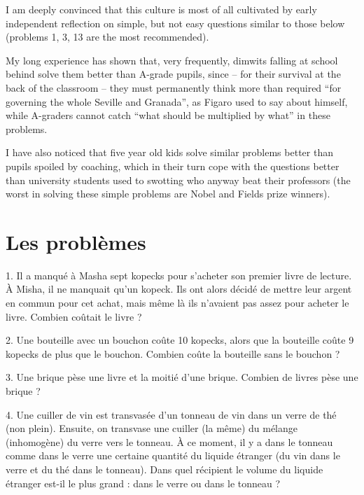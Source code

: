 I am deeply convinced that this culture is most of all cultivated by early independent reflection
on simple, but not easy questions similar to those below (problems 1, 3, 13 are the most recommended).

My long experience has shown that, very frequently, dimwits falling at school behind solve them better
than A-grade pupils, since -- for their survival at the back of the classroom -- they must permanently
think more than required \enquote{for governing the whole Seville and Granada}, as Figaro used to say about
himself, while A-graders cannot catch \enquote{what should be multiplied by what} in these problems.

I have also noticed that five year old kids solve similar problems better than pupils spoiled
by coaching, which in their turn cope with the questions better than university students used
to swotting who anyway beat their professors (the worst in solving these simple problems are
Nobel and Fields prize winners).

\clearpage
\section*{Les problèmes}

\begin{problem}{1.}
	Il a manqué à Masha sept kopecks pour s'acheter son premier livre de lecture.
	À Misha, il ne manquait qu'un kopeck.
	Ils ont alors décidé de mettre leur argent en commun pour cet achat, mais même là ils 
	n'avaient pas assez pour acheter le livre.
	Combien coûtait le livre ?
\end{problem}

\begin{problem}{2.}
	Une bouteille avec un bouchon coûte 10 kopecks, alors que la bouteille coûte 9 kopecks de 
	plus que le bouchon.
	Combien coûte la bouteille sans le bouchon ?
\end{problem}

\begin{problem}{3.}
	Une brique pèse une livre et la moitié d'une brique. Combien de livres pèse une brique ?
\end{problem}

\begin{problem}{4.}
	Une cuiller de vin est transvasée d'un tonneau de vin dans un verre de thé (non plein).
	Ensuite, on transvase une cuiller (la même) du mélange (inhomogène) du verre vers le tonneau.
	À ce moment, il y a dans le tonneau comme dans le verre une certaine quantité du liquide étranger 
	(du vin dans le verre et du thé dans le tonneau).
	Dans quel récipient le volume du liquide étranger est-il le plus grand : dans le verre ou dans 
	le tonneau ?
\end{problem}

